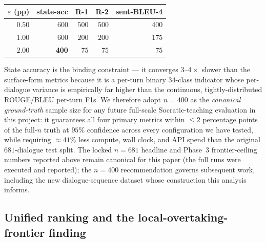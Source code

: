 \documentclass[11pt]{article}
\begin{document}
\begin{center}
\small
\begin{tabular}{r|rrrr}
\toprule
$\varepsilon$ (pp) & state-acc & R-1 & R-2 & sent-BLEU-4 \\
\midrule
$0.50$ & $600$ & $500$ & $500$ & $400$ \\
$1.00$ & $600$ & $200$ & $200$ & $175$ \\
$2.00$ & \textbf{400} & $\phantom{0}75$ & $\phantom{0}75$ & $\phantom{0}75$ \\
\bottomrule
\end{tabular}
\end{center}

State accuracy is the binding constraint --- it converges $3$--$4\times$ slower than the surface-form metrics because it is a per-turn binary $34$-class indicator whose per-dialogue variance is empirically far higher than the continuous, tightly-distributed ROUGE/BLEU per-turn F1s. We therefore adopt $n{=}400$ as the \emph{canonical ground-truth} sample size for any future full-scale Socratic-teaching evaluation in this project: it guarantees all four primary metrics within $\leq 2$ percentage points of the full-$n$ truth at $95\%$ confidence across every configuration we have tested, while requiring $\approx 41\%$ less compute, wall clock, and API spend than the original $681$-dialogue test split. The locked $n{=}681$ headline and Phase~3 frontier-ceiling numbers reported above remain canonical for this paper (the full runs were executed and reported); the $n{=}400$ recommendation governs subsequent work, including the new dialogue-sequence dataset whose construction this analysis informs.

\subsection{Unified ranking and the local-overtaking-frontier finding}
\label{sec:unified-ranking-overtaking}
\end{document}

